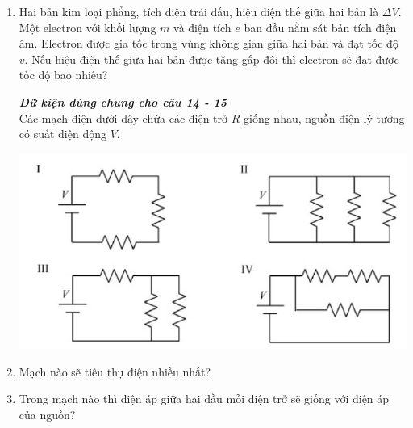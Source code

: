 \begin{enumerate}[label=\bfseries Câu \arabic*:]
\item Hai bản kim loại phẳng, tích điện trái dấu, hiệu điện thế giữa hai bản là $\Delta V$. Một electron với khối lượng $m$ và điện tích $e$ ban đầu nằm sát bản tích điện âm. Electron được gia tốc trong vùng không gian giữa hai bản và đạt tốc độ $v$. Nếu hiệu điện thế giữa hai bản được tăng gấp đôi thì electron sẽ đạt được tốc độ bao nhiêu?
\textbf{\textit{Dữ kiện dùng chung cho câu 14 - 15}}\\
Các mạch điện dưới dây chứa các điện trở $R$ giống nhau, nguồn điện lý tưởng có suất điện động $V$.
\begin{center}
	\includegraphics[width=0.6\linewidth]{../figs/PH11-FinalSem2-01-3}
\end{center}
\item Mạch nào sẽ tiêu thụ điện nhiều nhất?

\item Trong mạch nào thì điện áp giữa hai đầu mỗi điện trở sẽ giống với điện áp của nguồn?


\end{enumerate}
